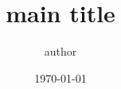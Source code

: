 \usepackage[a4paper]{geometry}
\usepackage{amssymb}
\usepackage{amsmath}
\usepackage{textcomp}
\usepackage{gensymb}
\usepackage{pgfplots}
\usepackage{fancyhdr}
\usepackage[backend=biber]{biblatex}
\usepackage[hidelinks]{hyperref}


\pgfplotsset{compat=newest}
\pgfplotsset{samples = 500}

\pagestyle{fancy}
\setlength{\headheight}{28pt}
\fancyhf{}
\fancyhead[R]{}
\fancyhead[L]{}
\fancyfoot[R]{\thepage}
\fancyfoot[L]{}
\renewcommand{\headrulewidth}{0.0pt}
\renewcommand{\footrulewidth}{0.0pt}



\title{main title}
\date{\today}
\author{author}